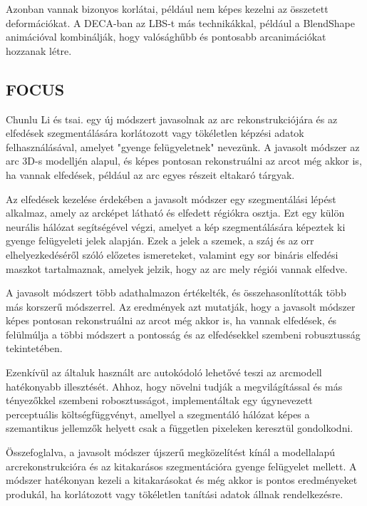 \documentclass[12pt,a4]{article}
\begin{document}
                Azonban vannak bizonyos korlátai, például nem képes kezelni az összetett deformációkat. A DECA-ban az LBS-t más technikákkal, például a 
                BlendShape animációval kombinálják, hogy valósághűbb és pontosabb arcanimációkat hozzanak létre.

        \subsection{FOCUS}

            \cite{focus}Chunlu Li és tsai. egy új módszert javasolnak az arc rekonstrukciójára és az elfedések szegmentálására korlátozott vagy tökéletlen képzési adatok felhasználásával, amelyet "gyenge felügyeletnek" nevezünk. A javasolt módszer az arc 3D-s modelljén alapul, és képes pontosan rekonstruálni az arcot még akkor is, ha vannak elfedések, például az arc egyes részeit eltakaró tárgyak.
    
            Az elfedések kezelése érdekében a javasolt módszer egy szegmentálási lépést alkalmaz, amely az arcképet látható és elfedett régiókra osztja. Ezt egy külön neurális hálózat segítségével végzi, amelyet a kép szegmentálására képeztek ki gyenge felügyeleti jelek alapján. Ezek a jelek a szemek, a száj és az orr elhelyezkedéséről szóló előzetes ismereteket, valamint egy sor bináris elfedési maszkot tartalmaznak, amelyek jelzik, hogy az arc mely régiói vannak elfedve.
    
            A javasolt módszert több adathalmazon értékelték, és összehasonlították több más korszerű módszerrel. Az eredmények azt mutatják, hogy a javasolt módszer képes pontosan rekonstruálni az arcot még akkor is, ha vannak elfedések, és felülmúlja a többi módszert a pontosság és az elfedésekkel szembeni robusztusság tekintetében.
    
            Ezenkívül az általuk használt arc autokódoló lehetővé teszi az arcmodell hatékonyabb illesztését. Ahhoz, hogy növelni tudják a megvilágítással és
     	      más tényezőkkel szembeni robosztusságot, implementáltak egy úgynevezett
     	      perceptuális költségfüggvényt, amellyel a szegmentáló hálózat képes a 
            szemantikus jellemzők helyett csak a független pixeleken keresztül gondolkodni.
    
            Összefoglalva, a javasolt módszer újszerű megközelítést kínál a modellalapú arcrekonstrukcióra és az kitakarásos szegmentációra gyenge felügyelet mellett. A módszer hatékonyan kezeli a kitakarásokat és még akkor is pontos eredményeket produkál, ha korlátozott vagy tökéletlen tanítási adatok állnak rendelkezésre.
\end{document}
